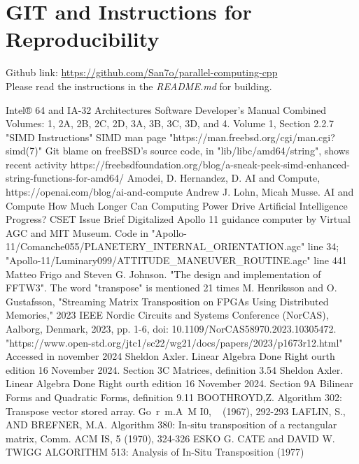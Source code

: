\documentclass[conference]{IEEEtran}
\begin{document}
\section{GIT and Instructions for Reproducibility}

Github link: \href{https://github.com/San7o/parallel-computing-cpp}{https://github.com/San7o/parallel-computing-cpp} \\
Please read the instructions in the \textit{README.md} for building.

\begin{thebibliography}{00}
 Intel® 64 and IA-32 Architectures Software Developer’s Manual Combined Volumes: 1, 2A, 2B, 2C, 2D, 3A, 3B, 3C, 3D, and 4. Volume 1, Section 2.2.7 "SIMD Instructions"
 SIMD man page "https://man.freebsd.org/cgi/man.cgi?simd(7)"
 Git blame on freeBSD's source code, in "lib/libc/amd64/string", shows recent activity
 https://freebsdfoundation.org/blog/a-sneak-peek-simd-enhanced-string-functions-for-amd64/
 Amodei, D. Hernandez, D. AI and Compute, https://openai.com/blog/ai-and-compute
 Andrew J. Lohn, Micah Musse. AI and Compute How Much Longer Can Computing Power Drive Artificial Intelligence Progress? CSET Issue Brief
 Digitalized Apollo 11 guidance computer by Virtual AGC and MIT Museum. Code in "Apollo-11/Comanche055/PLANETERY\_INTERNAL\_ORIENTATION.agc" line 34; "Apollo-11/Luminary099/ATTITUDE\_MANEUVER\_ROUTINE.agc" line 441
 Matteo Frigo and Steven G. Johnson. "The design and implementation of FFTW3". The word "transpose" is mentioned 21 times
 M. Henriksson and O. Gustafsson, "Streaming Matrix Transposition on FPGAs Using Distributed Memories," 2023 IEEE Nordic Circuits and Systems Conference (NorCAS), Aalborg, Denmark, 2023, pp. 1-6, doi: 10.1109/NorCAS58970.2023.10305472.
 "https://www.open-std.org/jtc1/sc22/wg21/docs/papers/2023/p1673r12.html" Accessed in november 2024
 Sheldon Axler. Linear Algebra Done Right ourth edition
16 November 2024. Section 3C Matrices, definition 3.54
 Sheldon Axler. Linear Algebra Done Right ourth edition
16 November 2024. Section 9A Bilinear Forms and Quadratic Forms, definition 9.11
 BOOTHROYD,Z. Algorithm 302: Transpose vector stored array. Go~r~m.A~M I0, ~ (1967),
292-293
 LAFLIN, S., AND BREFNER, M.A. Algorithm 380: In-situ transposition of a rectangular
matrix, Comm. ACM IS, 5 (1970), 324-326
 ESKO G. CATE and DAVID W. TWIGG ALGORITHM 513: Analysis of In-Situ Transposition (1977)

\end{thebibliography}
\end{document}
